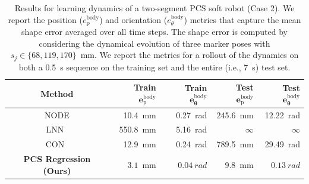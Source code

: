 \begin{table}[htbp]
\centering
\caption{Results for learning dynamics of a two-segment PCS soft robot (Case 2). We report the position ($e_\mathrm{p}^\mathrm{body}$) and orientation ($e_\theta^\mathrm{body}$) metrics that capture the mean shape error averaged over all time steps. The shape error is computed by considering the dynamical evolution of three marker poses with $s_j \in \{ 68, 119, 170 \}$~\si{mm}. We report the metrics for a rollout of the dynamics on both a \SI{0.5}{s} sequence on the training set and the entire (i.e., \SI{7}{s}) test set.}
\label{tab:pcsregression:dynamics_pcs_ns-2_with_baselines}
\setlength\tabcolsep{3pt}
\begin{small}
\begin{tabular}{c r r r r}
    \toprule
    \textbf{Method} & \textbf{Train} $\mathbf{e_\mathrm{p}^\mathrm{body}}$ & \textbf{Train} $\mathbf{e_\theta^\mathrm{body}}$ & \textbf{Test} $\mathbf{e_\mathrm{p}^\mathrm{body}}$ & \textbf{Test} $\mathbf{e_\theta^\mathrm{body}}$\\
    \midrule
    \gls{NODE} & \SI{10.4}{mm} & \SI{0.27}{rad} & \SI{245.6}{mm} & \SI{12.22}{rad}\\
    \gls{LNN}~\cite{liu2024physics} & \SI{550.8}{mm} & \SI{5.16}{rad} & $\infty$ & $\infty$\\
    \gls{CON}~\cite{stolzle2024input} & \SI{12.9}{mm} & \SI{0.24}{rad} & \SI{789.5}{mm} & \SI{29.49}{rad}\\
    \textbf{PCS Regression (Ours)} & $\mathbf{3.1}$~\si{mm} & $\mathbf{0.04}~\si{rad}$ & $\mathbf{9.8}$~\si{mm} & $\mathbf{0.13}~\si{rad}$\\
    \bottomrule
\end{tabular}
\end{small}
\end{table}

